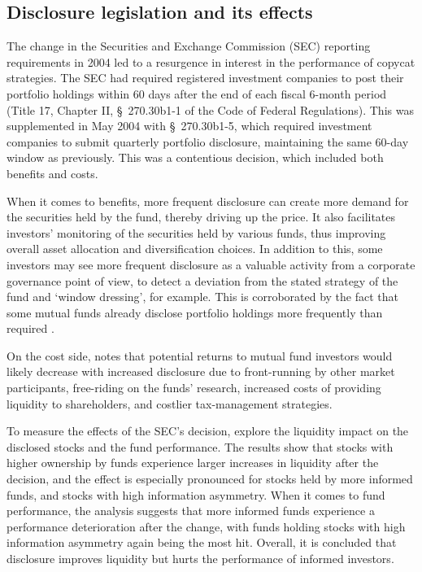 \documentclass[12pt, a4]{article}
\begin{document}
\subsection{Disclosure legislation and its effects}

The change in the Securities and Exchange Commission (\textsc{SEC}) reporting requirements in 2004 led to a resurgence in interest in the performance of copycat strategies. The \textsc{SEC} had required registered investment companies to post their portfolio holdings within 60 days after the end of each fiscal 6-month period (Title 17, Chapter II, \S\ 270.30b1-1 of the Code of Federal Regulations). This was supplemented in May 2004 with \S\ 270.30b1-5, which required investment companies to submit quarterly portfolio disclosure, maintaining the same 60-day window as previously. This was a contentious decision, which included both benefits and costs.

When it comes to benefits, more frequent disclosure can create more demand for the securities held by the fund, thereby driving up the price. It also facilitates investors' monitoring of the securities held by various funds, thus improving overall asset allocation and diversification choices. In addition to this, some investors may see more frequent disclosure as a valuable activity from a corporate governance point of view, to detect a deviation from the stated strategy of the fund and `window dressing', for example. This is corroborated by the fact that some mutual funds already disclose portfolio holdings more frequently than required \citep{frank}.

On the cost side, \cite{wermers_2001} notes that potential returns to mutual fund investors would likely decrease with increased disclosure due to front-running by other market participants, free-riding on the funds' research, increased costs of providing liquidity to shareholders, and costlier tax-management strategies.

To measure the effects of the \textsc{SEC}'s decision, \cite{agarwal} explore the liquidity impact on the disclosed stocks and the fund performance. The results show that stocks with higher ownership by funds experience larger increases in liquidity after the decision, and the effect is especially pronounced for stocks held by more informed funds, and stocks with high information asymmetry. When it comes to fund performance, the analysis suggests that more informed funds experience a performance deterioration after the change, with funds holding stocks with high information asymmetry again being the most hit. Overall, it is concluded that disclosure improves liquidity but hurts the performance of informed investors.
\end{document}
